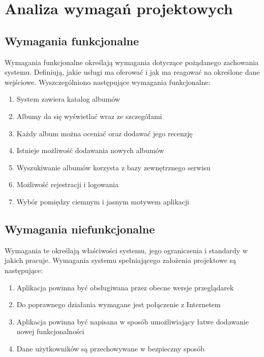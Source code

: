 
\chapter{Analiza wymagań projektowych}
\label{sec:analiza}

\section{Wymagania funkcjonalne}
	Wymagania funkcjonalne określają wymagania dotyczące pożądanego zachowania systemu.
	Definiują, jakie usługi ma oferować i jak ma reagować na określone dane wejściowe.
	Wyszczególniono następujące wymagania funkcjonalne:
	\begin{enumerate}
		\item System zawiera katalog albumów
		\item Albumy da się wyświetlać wraz ze szczegółami
		\item Każdy album można oceniać oraz dodawać jego recenzję
		\item Istnieje możliwość dodawania nowych albumów
		\item Wyszukiwanie albumów korzysta z bazy zewnętrznego serwisu
		\item Możliwość rejestracji i logowania
		\item Wybór pomiędzy ciemnym i jasnym motywem aplikacji
	\end{enumerate}

\section{Wymagania niefunkcjonalne}
	Wymagania te określają właściwości systemu, jego ograniczenia i standardy w jakich pracuje.
	Wymagania systemu spełniającego założenia projektowe są następujące:
	\begin{enumerate}
		\item Aplikacja powinna być obsługiwana przez obecne wersje przeglądarek
		\item Do poprawnego działania wymagane jest połączenie z Internetem
		\item Aplikacja powinna być napisana w sposób umożliwiający łatwe dodawanie nowej funkcjonalności
		\item Dane użytkowników są przechowywane w bezpieczny sposób
	\end{enumerate}

